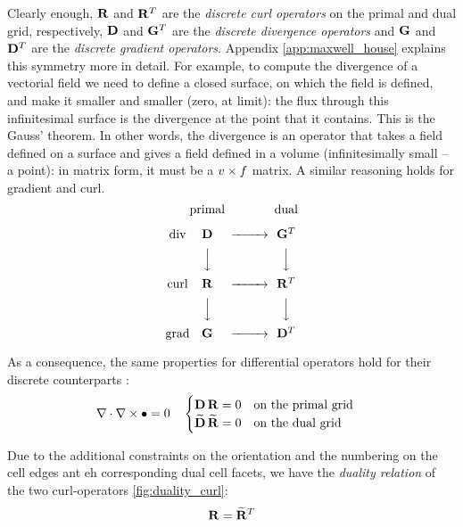 Clearly enough, $\mathbf{R}$ and ${\mathbf{R}}^T$ are the
\emph{discrete curl operators} on the primal and dual grid,
respectively, $\mathbf{D}$ and ${\mathbf{G}}^T$ are the
\emph{discrete divergence operators} and $\mathbf{G}$ and
${\mathbf{D}}^T$ are the \emph{discrete gradient
operators}. Appendix \ref{app:maxwell_house} explains this symmetry
more in detail. For example, to compute the divergence of a vectorial
field we need to define a closed surface, on which the field is
defined, and make it smaller and smaller (zero, at limit): the flux
through this infinitesimal surface is the divergence at the point that
it contains. This is the Gauss' theorem. In other words, the
divergence is an operator that takes a field defined on a surface and
gives a field defined in a volume (infinitesimally small -- a point):
in matrix form, it must be a ${v \times f}$ matrix. A similar
reasoning holds for gradient and curl.
$$
\begin{CD}
  @. \text{primal} @. \text{dual} \\
  \text{div}  @. \Matrix{D} @>>> \Transpose{\Matrix{G}} \\
  @.             @VVV            @VVV \\
  \text{curl} @. \Matrix{R} @>>> \Transpose{\Matrix{R}} \\
  @.             @VVV            @VVV \\
  \text{grad} @. \Matrix{G} @>>> \Transpose{\Matrix{D}}
\end{CD}
$$

As a consequence, the same properties for differential operators hold
for their discrete counterparts \cite{schuhmann_nonorthogonal}:
\begin{align*}
  {\nabla\cdot {\nabla\times \bullet}} & = 0 && \begin{cases}
  {\mathbf{D}\,\mathbf{R}} = 0 & \text{on the primal grid} \\ 
  {\widetilde{\mathbf{D}}\,\widetilde{\mathbf{R}}} = 0 & \text{on the dual grid}
  \end{cases}
\end{align*}

Due to the additional constraints on the orientation and the numbering
on the cell edges ant eh corresponding dual cell facets, we have the
\emph{duality relation} of the two curl-operators \ref{fig:duality_curl}:
\begin{equation*}
  \mathbf{R} = {\widetilde{\mathbf{R}}}^T
\end{equation*}

